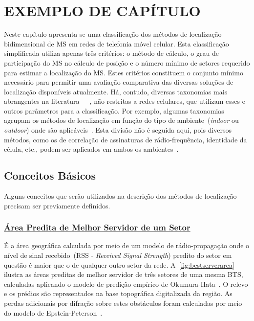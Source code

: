 \chapter{EXEMPLO DE CAPÍTULO}
\label{chapter:exemplo}

Neste capítulo apresenta-se uma classificação dos métodos de localização bidimensional de MS em redes de telefonia móvel celular. Esta classificação simplificada utiliza apenas três critérios: o método de cálculo, o grau de participação do MS no cálculo de posição e o número mínimo de setores requerido para estimar a localização do MS. Estes critérios constituem o conjunto mínimo necessário para permitir uma avaliação comparativa das diversas soluções de localização disponíveis atualmente. Há, contudo, diversas taxonomias mais abrangentes na literatura~\cite{LocationMethodsSurvey2007}~\cite{WlanLocationMethodsSurvey}~\cite{LocationMethodsSurvey2008}, não restritas a redes celulares, que utilizam esses e outros parâmetros para a classificação. Por exemplo, algumas taxonomias agrupam os métodos de localização em função do tipo de ambiente~(\textit{indoor} ou \textit{outdoor}) onde são aplicáveis~\cite{WlanLocationMethodsSurvey}. Esta divisão não é seguida aqui, pois diversos métodos, como os de correlação de assinaturas de rádio-frequência, identidade da célula, etc., podem ser aplicados em ambos os ambientes~\cite{DcmForGsm}.

\section{\textbf{Conceitos Básicos}}
\label{sec:Cap1Conceitos}

Alguns conceitos que serão utilizados na descrição dos métodos de localização precisam ser previamente definidos.

\subsection{\underline{Área Predita de Melhor Servidor de um Setor}}
É a área geográfica calculada por meio de um modelo de rádio-propagação onde o nível de sinal recebido~(RSS - \textit{Received Signal Strength}) predito do setor em questão é maior que o de qualquer outro setor da rede. A~\ref{fig:bestserverarea} ilustra as áreas preditas de melhor servidor de três setores de uma mesma BTS, calculadas aplicando o modelo de predição empírico de Okumura-Hata~\cite{HATA1980}. O relevo e os prédios são representados na base topográfica digitalizada da região. As perdas adicionais por difração sobre estes obstáculos foram calculadas por meio do modelo de Epstein-Peterson~\cite{MDY1993}.

